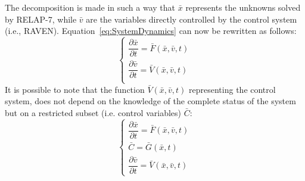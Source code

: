 \documentclass{anstrans}
\begin{document}
The decomposition is made in such a way that $\bar{x}$ represents the unknowns solved by RELAP-7, while $\bar{v}$ are the variables directly controlled by the control system (i.e., RAVEN). Equation~\ref{eq:SystemDynamics} can now be rewritten as follows:
\begin{equation}
\begin{cases} 
\dfrac{\partial \bar{x}}{\partial t} = \bar{F}(\bar{x},\bar{v},t) \\ 
\dfrac{\partial \bar{v}}{\partial t} = \bar{V}(\bar{x},\bar{v},t) \\
\end{cases}
\label{eq:generalSystemEquation}
\end{equation}
It is possible to note that the function $\bar{V}(\bar{x},\bar{v},t)$ representing the control system, does not depend on the knowledge of the complete status of the system but on a restricted subset (i.e. control variables) $\bar{C}$:
\begin{equation}
\begin{cases} 
\dfrac{\partial \bar{x}}{\partial t} = \bar{F}(\bar{x},\bar{v},t) \\
\bar{C} = \bar{G}(\bar{x},t) \\ 
\dfrac{\partial \bar{v}}{\partial t} = \bar{V}(\bar{x},\bar{v},t) 
\end{cases}
\label{eq:generalSystemEquationwithControl}
\end{equation}
\end{document}
